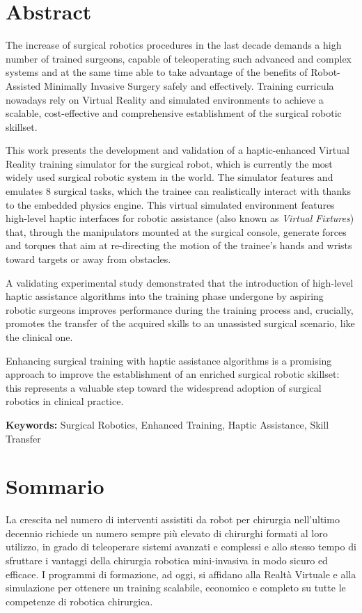 \documentclass[../main.tex]{subfiles}
\begin{document}
\chapter*{Abstract}
The increase of surgical robotics procedures in the last decade demands a high number of trained surgeons, capable of teleoperating such advanced and complex systems and at the same time able to take advantage of the benefits of Robot-Assisted Minimally Invasive Surgery safely and effectively. Training curricula nowadays rely on Virtual Reality and simulated environments to achieve a scalable, cost-effective and comprehensive establishment of the surgical robotic skillset.

This work presents the development and validation of a haptic-enhanced Virtual Reality training simulator for the \davinci surgical robot, which is currently the most widely used surgical robotic system in the world. The simulator features and emulates 8 surgical tasks, which the trainee can realistically interact with thanks to the embedded physics engine. This virtual simulated environment features high-level haptic interfaces for robotic assistance (also known as \textit{Virtual Fixtures}) that, through the manipulators mounted at the surgical console, generate forces and torques that aim at re-directing the motion of the trainee's hands and wrists toward targets or away from obstacles. 

A validating experimental study demonstrated that the introduction of high-level haptic assistance algorithms into the training phase undergone by aspiring robotic surgeons improves performance during the training process and, crucially, promotes the transfer of the acquired skills to an unassisted surgical scenario, like the clinical one. 

Enhancing surgical training with haptic assistance algorithms is a promising approach to improve the establishment of an enriched surgical robotic skillset: this represents a valuable step toward the widespread adoption of surgical robotics in clinical practice.

\textbf{Keywords:} Surgical Robotics, Enhanced Training, Haptic Assistance, Skill Transfer

\newpage\newpage
{}
\chapter*{Sommario}
La crescita nel numero di interventi assistiti da robot per chirurgia nell'ultimo decennio richiede un numero sempre più elevato di chirurghi formati al loro utilizzo, in grado di teleoperare sistemi avanzati e complessi e allo stesso tempo di sfruttare i vantaggi della chirurgia robotica mini-invasiva in modo sicuro ed efficace. I programmi di formazione, ad oggi, si affidano alla Realtà Virtuale e alla simulazione per ottenere un training scalabile, economico e completo su tutte le competenze di robotica chirurgica.
\end{document}
